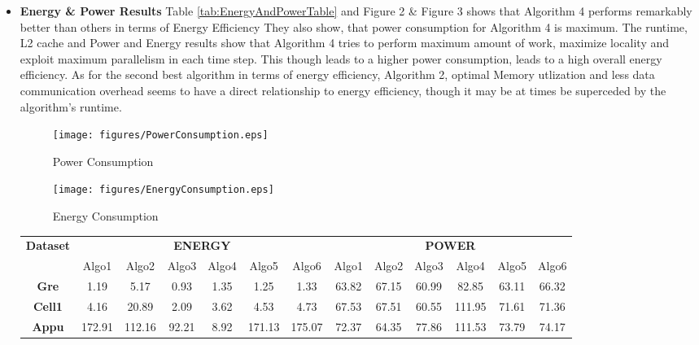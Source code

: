 \begin{itemize}
\item
\textbf{Energy \& Power Results}
Table \ref{tab:EnergyAndPowerTable} and Figure 2 \& Figure 3 shows
that Algorithm 4 performs remarkably better than others in terms of
Energy Efficiency They also show, that power consumption for Algorithm
4 is maximum. The runtime, L2 cache and Power  and Energy results show
that Algorithm 4 tries to perform maximum amount of work, maximize
locality and exploit maximum parallelism in each time step. This
though leads to a higher power consumption, leads to a high overall
energy efficiency.  As for the second best algorithm in terms of
energy efficiency, Algorithm 2, optimal Memory utlization and less
data communication overhead  seems to have a direct relationship to
energy efficiency, though it may be at times be superceded by the
algorithm's runtime.
\begin{figure}[t]
    \centering
    \texttt{[image: figures/PowerConsumption.eps]}
    \caption{Power Consumption}
    \label{fig:Power Consumption}
\end{figure}
\begin{figure}[t]
    \centering
    \texttt{[image: figures/EnergyConsumption.eps]}
    \caption{Energy Consumption}
    \label{fig:Energy Consumption}
\end{figure}
\begin{table}[th]
\small
\centering
\begin{tabular}{ c|c|c|c|c|c|c|c|c|c|c|c|c| }
\hline
\multicolumn{1}{|c|}{\textbf{Dataset}} &
\multicolumn{6}{c}{\textbf{ENERGY}}&
  \multicolumn{6}{|c|}{\textbf{POWER}} \\
  \cline{2-13}
  \multicolumn{1}{|c|}{} &
  Algo1 & Algo2 & Algo3 & Algo4 & Algo5 & Algo6 & Algo1 & Algo2 & Algo3 & Algo4 & Algo5 & Algo6\\\hline
    \hline
  \multicolumn{1}{|c|}{\textbf{Gre}}
& 1.19 & 5.17 & \cellcolor{blue!25}0.93 & 1.35 & 1.25 & 1.33 & 63.82 & 67.15 & \cellcolor{green!25}60.99 & 82.85 & 63.11 & 66.32 \\ \hline
  \multicolumn{1}{|c|}{\textbf{Cell1}}
& 4.16 & 20.89 & \cellcolor{blue!25}2.09 & 3.62 & 4.53 & 4.73 & 67.53 & 67.51 & \cellcolor{green!25}60.55 & 111.95 & 71.61 & 71.36\\ \hline
  \multicolumn{1}{|c|}{\textbf{Appu}}
& 172.91 & 112.16 & 92.21 & \cellcolor{blue!25}8.92 & 171.13 & 175.07 & 72.37 & \cellcolor{green!25}64.35 & 77.86 & 111.53 & 73.79 & 74.17\\ \hline

\end{tabular}
\end{table}
\end{itemize}
